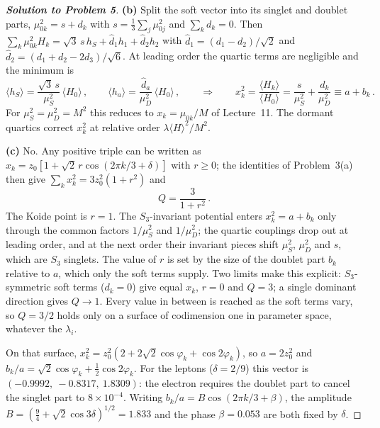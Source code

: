 \documentclass[11pt,a4paper]{article}
\begin{document}
\begin{proof}[\textbf{Solution to Problem 5}]
\medskip

\textbf{(b)} Split the soft vector into its singlet and doublet parts,
$\mu_{0k}^2 = s + d_k$ with $s = \tfrac13\sum_j\mu_{0j}^2$ and
$\sum_k d_k = 0$.  Then
$\sum_k \mu_{0k}^2 H_k = \sqrt3\,s\,h_S + \hat d_1 h_1 + \hat d_2 h_2$
with $\hat d_1 = (d_1-d_2)/\sqrt2$ and
$\hat d_2 = (d_1+d_2-2d_3)/\sqrt6$.  At leading order the quartic
terms are negligible and the minimum is
\begin{equation*}
  \langle h_S\rangle = \frac{\sqrt3\,s}{\mu_S^2}\,\langle H_0\rangle\,,
  \qquad
  \langle h_a\rangle = \frac{\hat d_a}{\mu_D^2}\,\langle H_0\rangle\,,
  \qquad\Longrightarrow\qquad
  x_k^2 = \frac{\langle H_k\rangle}{\langle H_0\rangle}
  = \frac{s}{\mu_S^2} + \frac{d_k}{\mu_D^2} \equiv a + b_k\,.
\end{equation*}
For $\mu_S^2 = \mu_D^2 = M^2$ this reduces to
$x_k = \mu_{0k}/M$ of Lecture~11.  The dormant quartics correct $x_k^2$
at relative order $\lambda\langle H\rangle^2/M^2$.

\medskip

\textbf{(c)} No.  Any positive triple can be written as
$x_k = z_0\left[1 + \sqrt2\,r\cos(2\pi k/3 + \delta)\right]$ with
$r \geq 0$; the identities of Problem~3(a) then give
$\sum_k x_k^2 = 3z_0^2(1+r^2)$ and
\begin{equation*}
  Q = \frac{3}{1+r^2}\,.
\end{equation*}
The Koide point is $r = 1$.  The $S_3$-invariant potential enters
$x_k^2 = a + b_k$ only through the common factors $1/\mu_S^2$ and
$1/\mu_D^2$; the quartic couplings drop out at leading order, and at
the next order their invariant pieces shift $\mu_S^2$, $\mu_D^2$ and
$s$, which are $S_3$ singlets.  The value of $r$ is set by the size
of the doublet part $b_k$ relative to $a$, which only the soft terms
supply.  Two limits make this explicit: $S_3$-symmetric soft terms
($d_k = 0$) give equal $x_k$, $r = 0$ and $Q = 3$; a single dominant
direction gives $Q \to 1$.  Every value in between is reached as the
soft terms vary, so $Q = 3/2$ holds only on a surface of codimension
one in parameter space, whatever the $\lambda_i$.

On that surface, $x_k^2 = z_0^2\left(2 + 2\sqrt2\cos\varphi_k
+ \cos 2\varphi_k\right)$, so $a = 2z_0^2$ and
$b_k/a = \sqrt2\cos\varphi_k + \tfrac12\cos 2\varphi_k$.  For the
leptons ($\delta = 2/9$) this vector is
$(-0.9992,\ -0.8317,\ 1.8309)$: the electron requires the doublet
part to cancel the singlet part to $8\times10^{-4}$.  Writing
$b_k/a = B\cos(2\pi k/3 + \beta)$, the amplitude
$B = \left(\tfrac94 + \sqrt2\cos3\delta\right)^{1/2} = 1.833$ and the
phase $\beta = 0.053$ are both fixed by $\delta$.


\end{proof}
\end{document}
